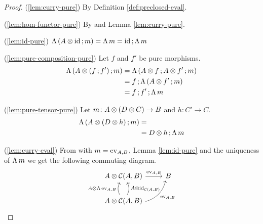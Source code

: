 \documentclass[runningheads,envcountsame]{llncs}
\begin{document}
\begin{proof}
    (\ref{lem:curry-pure}) By Definition \ref{def:preclosed-eval}.
    
    (\ref{lem:hom-functor-pure}) By  and Lemma \ref{lem:curry-pure}.
    
    (\ref{lem:id-pure}) $\curry\,(\comp{\tensor{A}{\id}}{m}) = \curry\,m = \comp{\id}{\curry\,m}$
    
    (\ref{lem:pure-composition-pure}) Let $f$ and $f'$ be pure morphisms.
    \begin{align}
        \curry\,(\comp{\tensor{A}{(\comp{f}{f'})}}{m}) &= \curry\,(\comp{\tensor{A}{f}}{\comp{\tensor{A}{f'}}{m}}) \\
        &= \comp{f}{\curry\,(\comp{\tensor{A}{f'}}{m})} \\
        &= \comp{\comp{f}{f'}}{\curry\,m}
    \end{align}
    
    (\ref{lem:pure-tensor-pure}) Let $m\colon \tensor{A}{(\tensor{D}{C})} \to B$ and $h\colon C' \to C$.
    \begin{align}
        \curry\,(\comp{\tensor{A}{(\tensor{D}{h})}}{m}) &=  \\
        &= \comp{\tensor{D}{h}}{\curry\,m} \\
    \end{align}
    
    (\ref{lem:curry-eval}) From  with $m = \eval_{A, B}$, Lemma \ref{lem:id-pure} and the uniqueness of $\curry\,m$ we get the following commuting diagram.
    \begin{equation}
    \begin{tikzcd}
        \tensor{A}{\C(A, B)} \ar[r, "\eval_{A, B}"] & B \\
        \tensor{A}{\C(A, B)} \ar[u, bend left, "\tensor{A}{\curry\,\eval_{A, B}}"] \ar[u, swap, bend right, "\tensor{A}{\id_{\C(A, B)}}"] \ar[ur, swap, bend right, "\eval_{A, B}"]
    \end{tikzcd}
    \end{equation}
    

\end{proof}
\end{document}
